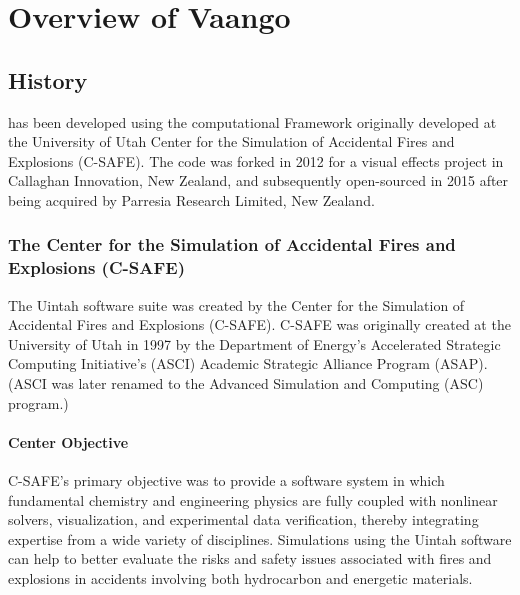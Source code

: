 \chapter{Overview of Vaango} \label{Sec:Overview} 

\section{History}
\Vaango has been developed using the \Uintah computational Framework originally developed
at the University of Utah Center for the Simulation of Accidental Fires and Explosions (C-SAFE).
The code was forked in 2012 for a visual effects project in Callaghan Innovation,
New Zealand, and subsequently open-sourced in 2015 after being acquired by
Parresia Research Limited, New Zealand.

\subsection{The Center for the Simulation of Accidental Fires and Explosions (C-SAFE)}
The Uintah software suite was created by the Center for the Simulation
of Accidental Fires and Explosions (C-SAFE).  C-SAFE was originally
created at the University of Utah in 1997 by the Department of
Energy's Accelerated Strategic Computing Initiative's (ASCI) Academic
Strategic Alliance Program (ASAP).  (ASCI was later renamed to
the Advanced Simulation and Computing (ASC) program.)

\subsubsection{Center Objective}
C-SAFE's primary objective was to provide a software system in
which fundamental chemistry and engineering physics are fully coupled
with nonlinear solvers, visualization, and experimental data
verification, thereby integrating expertise from a wide variety of
disciplines. Simulations using the Uintah software can help to better
evaluate the risks and safety issues associated with fires and
explosions in accidents involving both hydrocarbon and energetic
materials.

